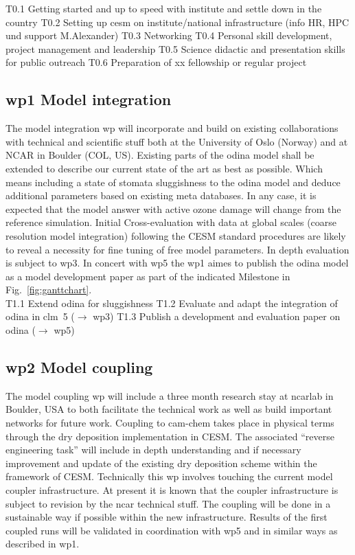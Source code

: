 T0.1 Getting started and up to speed with institute and settle down in the country
T0.2 Setting up \gls{cesm} on institute/national infrastructure (info HR, HPC und support M.Alexander)
T0.3 Networking
T0.4 Personal skill development, project management and leadership
T0.5 Science didactic and presentation skills for public outreach
T0.6 Preparation of xx fellowship or regular project 

\subsection*{\gls{wp}1 Model integration}
\label{ssec:wp1}
The model integration \gls{wp} will incorporate and build on existing collaborations with technical and scientific stuff both at the University of Oslo (Norway) and at NCAR in Boulder (COL, US). Existing parts of the \gls{odina} model shall be extended to describe our current state of the art as best as possible. Which means including a state of stomata sluggishness to the \gls{odina} model and deduce additional parameters based on existing meta databases. In any case, it is expected that the model answer with active ozone damage will change from the reference simulation. Initial Cross-evaluation with data at global scales (coarse resolution model integration) following the CESM standard procedures are likely to reveal a necessity for fine tuning of free model parameters. In depth evaluation is subject to \gls{wp}3. In concert with \gls{wp}5 the \gls{wp}1 aimes to publish the \gls{odina} model as a model development paper as part of the indicated Milestone in Fig.~\ref{fig:ganttchart}.\\

T1.1 Extend \gls{odina} for sluggishness  
T1.2 Evaluate and adapt the integration of \gls{odina} in \gls{clm}~5 ($\rightarrow$ \gls{wp}3)
T1.3 Publish a development and evaluation paper on \gls{odina} ($\rightarrow$ \gls{wp}5)

\subsection*{\gls{wp}2 Model coupling}
\label{ssec:wp2}
The model coupling \gls{wp} will include a three month research stay at \gls{ncar}lab in Boulder, USA to both facilitate the technical work as well as build important networks for future work. Coupling to \gls{cam}-chem takes place in physical terms through the dry deposition implementation in CESM. The associated “reverse engineering task” will include in depth understanding and if necessary improvement and update of the existing dry deposition scheme within the framework of CESM. Technically this \gls{wp} involves touching the current model coupler infrastructure. At present it is known that the coupler infrastructure is subject to revision by the \gls{ncar} technical stuff. The coupling will be done in a sustainable way if possible within the new infrastructure. Results of the first coupled runs will be validated in coordination with \gls{wp}5 and in similar ways as described in \gls{wp}1.\\


